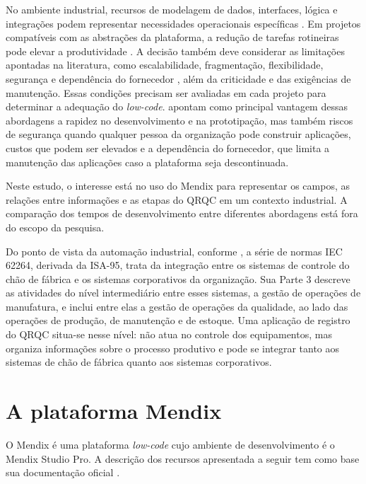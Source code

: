 No ambiente industrial, recursos de modelagem de dados, interfaces, lógica e integrações podem representar necessidades operacionais específicas \cite[p.~172--176]{sahay2020}. Em projetos compatíveis com as abstrações da plataforma, a redução de tarefas rotineiras pode elevar a produtividade \cite[p.~737--738]{bockfrank2021}. A decisão também deve considerar as limitações apontadas na literatura, como escalabilidade, fragmentação, flexibilidade, segurança e dependência do fornecedor \cite[seç.~1]{sanchis2020}, além da criticidade e das exigências de manutenção. Essas condições precisam ser avaliadas em cada projeto para determinar a adequação do \textit{low-code}.  apontam como principal vantagem dessas abordagens a rapidez no desenvolvimento e na prototipação, mas também riscos de segurança quando qualquer pessoa da organização pode construir aplicações, custos que podem ser elevados e a dependência do fornecedor, que limita a manutenção das aplicações caso a plataforma seja descontinuada.

Neste estudo, o interesse está no uso do Mendix para representar os campos, as relações entre informações e as etapas do QRQC em um contexto industrial. A comparação dos tempos de desenvolvimento entre diferentes abordagens está fora do escopo da pesquisa.

Do ponto de vista da automação industrial, conforme , a série de normas IEC 62264, derivada da ISA-95, trata da integração entre os sistemas de controle do chão de fábrica e os sistemas corporativos da organização. Sua Parte 3 descreve as atividades do nível intermediário entre esses sistemas, a gestão de operações de manufatura, e inclui entre elas a gestão de operações da qualidade, ao lado das operações de produção, de manutenção e de estoque. Uma aplicação de registro do QRQC situa-se nesse nível: não atua no controle dos equipamentos, mas organiza informações sobre o processo produtivo e pode se integrar tanto aos sistemas de chão de fábrica quanto aos sistemas corporativos.

\section{A plataforma Mendix}
\label{sec:mendix}

O Mendix é uma plataforma \textit{low-code} cujo ambiente de desenvolvimento é o Mendix Studio Pro. A descrição dos recursos apresentada a seguir tem como base sua documentação oficial \cite{mendix2025modeling}.

